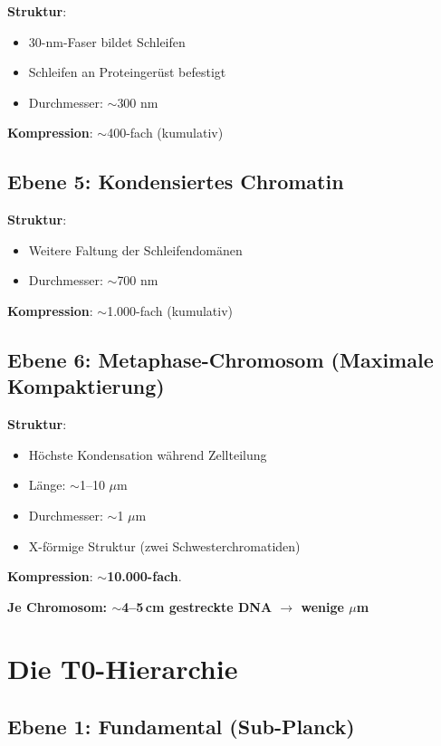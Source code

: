 	\textbf{Struktur}:
	\begin{itemize}
		\item 30-nm-Faser bildet Schleifen
		\item Schleifen an Proteingerüst befestigt
		\item Durchmesser: $\sim$300 nm
	\end{itemize}

	\textbf{Kompression}: $\sim$400-fach (kumulativ)

	\subsection{Ebene 5: Kondensiertes Chromatin}

	\textbf{Struktur}:
	\begin{itemize}
		\item Weitere Faltung der Schleifendomänen
		\item Durchmesser: $\sim$700 nm
	\end{itemize}

	\textbf{Kompression}: $\sim$1.000-fach (kumulativ)

	\subsection{Ebene 6: Metaphase-Chromosom (Maximale Kompaktierung)}

	\textbf{Struktur}:
	\begin{itemize}
		\item Höchste Kondensation während Zellteilung
		\item Länge: $\sim$1--10 $\mu$m
		\item Durchmesser: $\sim$1 $\mu$m
		\item X-förmige Struktur (zwei Schwesterchromatiden)
	\end{itemize}

	\textbf{Kompression}: $\sim$\textbf{10.000-fach}.

	\begin{center}
		\textbf{Je Chromosom: $\sim$4--5\,cm gestreckte DNA $\to$ wenige $\mu$m}
	\end{center}

	\section{Die T0-Hierarchie}

	\subsection{Ebene 1: Fundamental (Sub-Planck)}

